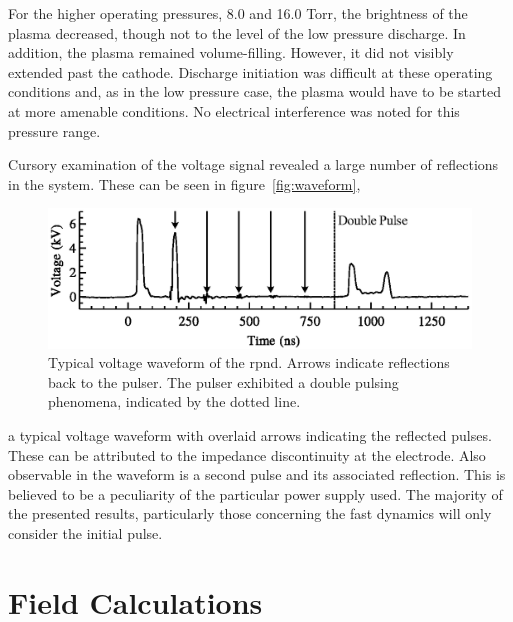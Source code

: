 For the higher operating pressures, 8.0 and 16.0 Torr, the brightness of the
plasma decreased, though not to the level of the low pressure discharge. In
addition, the plasma remained volume-filling. However, it did not visibly
extended past the cathode. Discharge initiation was difficult at these operating
conditions and, as in the low pressure case, the plasma would have to be started
at more amenable conditions. No electrical interference was noted for this
pressure range.

Cursory examination of the voltage signal revealed a large number of reflections
in the system. These can be seen in figure~\ref{fig:waveform},
\begin{figure}
  \centering
  \includegraphics{./chapters/experiment/figures/waveform.eps}
  \caption{Typical voltage waveform of the \acs{rpnd}. Arrows indicate
  reflections back to the pulser. The pulser exhibited a double pulsing
  phenomena, indicated by the dotted line.}
\end{figure}
a typical voltage waveform with overlaid arrows indicating the reflected pulses.
These can be attributed to the impedance discontinuity at the electrode. Also
observable in the waveform is a second pulse and its associated reflection. This
is believed to be a peculiarity of the particular power supply used. The
majority of the presented results, particularly those concerning the fast
dynamics will only consider the initial pulse.

\section{Field Calculations}

